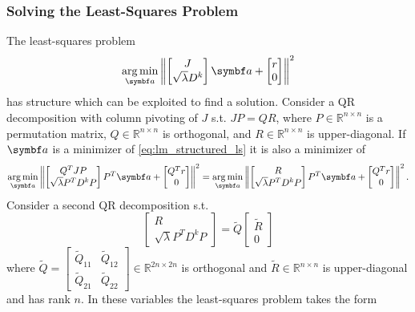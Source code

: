 \subsubsection{Solving the Least-Squares Problem}
The least-squares problem
\begin{equation}
  \label{eq:lm_structured_ls}
  \argmin_{\a} \left\| \begin{bmatrix} J \\ \sqrt{\lambda} D^k \end{bmatrix} \a + \begin{bmatrix} r \\ 0 \end{bmatrix} \right\|^2
\end{equation}
has structure which can be exploited to find a solution. Consider a QR decomposition with column pivoting of $J$ s.t. $J P = Q R$, where $P \in \mathbb{R}^{n \times n}$ is a permutation matrix, $Q \in \mathbb{R}^{n \times n}$ is orthogonal, and $R \in \mathbb{R}^{n \times n}$ is upper-diagonal. If $\a$ is a minimizer of \eqref{eq:lm_structured_ls} it is also a minimizer of
\begin{equation}
  \label{eq:lm_structured_ls}
  \argmin_{\a} \left\| \begin{bmatrix} Q^{T} J P \\ \sqrt{\lambda} P^{T} D^k P \end{bmatrix} P^{T} \a + \begin{bmatrix} Q^{T} r \\ 0 \end{bmatrix} \right\|^2 =     \argmin_{\a} \left\| \begin{bmatrix} R \\ \sqrt{\lambda} P^{T} D^k P \end{bmatrix} P^{T} \a + \begin{bmatrix} Q^{T} r \\ 0 \end{bmatrix} \right\|^2.
\end{equation}
Consider a second QR decomposition s.t.
\begin{equation}
  \begin{bmatrix}
    R \\ \sqrt{\lambda} P^{T} D^{k} P
  \end{bmatrix} = \tilde Q \begin{bmatrix} \tilde R \\ 0 \end{bmatrix}
\end{equation}
where $\tilde Q = \begin{bmatrix} \tilde Q_{11} & \tilde Q_{12} \\ \tilde Q_{21} & \tilde Q_{22} \end{bmatrix} \in \mathbb{R}^{2n \times 2n}$ is orthogonal and $\tilde R \in \mathbb{R}^{n \times n}$ is upper-diagonal and has rank $n$. In these variables the least-squares problem takes the form
